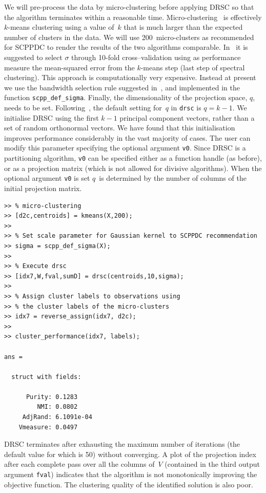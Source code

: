 \documentclass{book}
\begin{document}
We will pre-process the data by micro-clustering before applying DRSC so that
the algorithm terminates within a reasonable time.
%
Micro-clustering~\cite{Zhang1996} is effectively $k$-means clustering using
a value of~$k$ that is much larger than the expected number of clusters in
the data.
%
We will use 200~micro-clusters as recommended for SCPPDC to render the results
of the two algorithms comparable.
%
In~\cite{NiuDJ2011} it
is suggested to select $\sigma$ through 10-fold cross--validation using as
performance measure the mean-squared error from the $k$-means step (last step of
spectral clustering).
%
This approach is computationally very expensive. Instead at present we use
the bandwidth selection rule suggested in~\cite{HofmeyrPE2018}, and implemented
in the function {\tt scpp\_def\_sigma}.
%
Finally, the dimensionality of the projection space, $q$, needs to be set.
Following~\cite{NiuDJ2011}, the default setting for~$q$ in {\tt drsc} is
$q=k-1$. We initialise DRSC using the first $k-1$ principal component vectors,
rather than a set of random orthonormal vectors.
We have found that this initialisation improves performance considerably
in the vast majority of cases.
%
The user can modify this parameter specifying the optional argument {\tt v0}. Since
DRSC is a partitioning algorithm, {\tt v0} can be specified either as a function
handle (as before), or as a projection matrix (which is not allowed for
divisive algorithms).
%
When the optional argument {\tt v0} is set $q$~is determined by the
number of columns of the initial projection matrix.


\begin{lstlisting}
>> % micro-clustering
>> [d2c,centroids] = kmeans(X,200); 
>>
>> % Set scale parameter for Gaussian kernel to SCPPDC recommendation
>> sigma = scpp_def_sigma(X);
>> 
>> % Execute drsc
>> [idx7,W,fval,sumD] = drsc(centroids,10,sigma);
>>
>> % Assign cluster labels to observations using
>> % the cluster labels of the micro-clusters
>> idx7 = reverse_assign(idx7, d2c);
>>
>> cluster_performance(idx7, labels);

ans = 

  struct with fields:

      Purity: 0.1283
         NMI: 0.0802
     AdjRand: 6.1091e-04
    Vmeasure: 0.0497

\end{lstlisting}


\noindent
%
DRSC terminates after exhausting the maximum number of iterations (the default
value for which is 50) without converging. A plot of the projection index after
each complete pass over all the columns of~$V$ (contained in the third
output argument {\tt fval}) indicates that the algorithm is not monotonically
improving the objective function.
%
The clustering quality of the identified solution is also poor.
\end{document}
